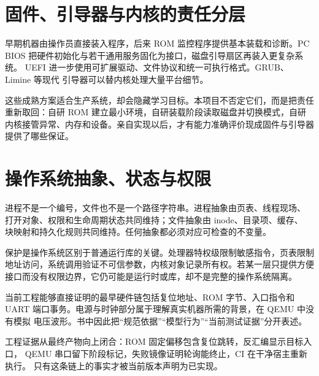 \section{固件、引导器与内核的责任分层}

早期机器由操作员直接装入程序，后来 ROM 监控程序提供基本装载和诊断。PC
BIOS 把硬件初始化与若干通用服务固化为接口，磁盘引导扇区再装入更复杂系统。
UEFI 进一步使用可扩展驱动、文件协议和统一可执行格式。GRUB、Limine 等现代
引导器可以替内核处理大量平台细节。

这些成熟方案适合生产系统，却会隐藏学习目标。本项目不否定它们，而是把责任
重新取回：自研 ROM 建立最小环境，自研装载阶段读取磁盘并切换模式，自研
内核接管异常、内存和设备。亲自实现以后，才有能力准确评价现成固件与引导器
提供了哪些保证。

\section{操作系统抽象、状态与权限}

进程不是一个编号，文件也不是一个路径字符串。进程抽象由页表、线程现场、
打开对象、权限和生命周期状态共同维持；文件抽象由 inode、目录项、缓存、
块映射和持久化规则共同维持。任何抽象都必须对应可检查的不变量。

保护是操作系统区别于普通运行库的关键。处理器特权级限制敏感指令，页表限制
地址访问，系统调用验证不可信参数，内核对象记录所有权。若某一层只提供方便
接口而没有权限边界，它仍可能是运行时或库，却不是完整的操作系统隔离。

当前工程能够直接证明的最早硬件链包括复位地址、ROM 字节、入口指令和 UART
端口事务。电源与时钟部分属于理解真实机器所需的背景，在 QEMU 中没有模拟
电压波形。书中因此把“规范依据”“模型行为”“当前测试证据”分开表述。

工程证据从最终产物向上闭合：ROM 固定偏移包含复位跳转，反汇编显示目标入口，
QEMU 串口留下阶段标记，失败镜像证明轮询能终止，CI 在干净宿主重新执行。
只有这条链上的事实才被当前版本声明为已实现。
